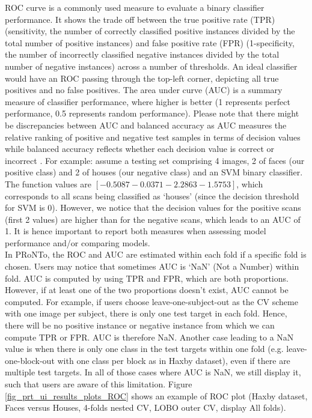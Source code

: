 ROC curve is a commonly used measure to evaluate a binary classifier performance. It shows the trade off between the true positive rate (TPR) (sensitivity, the number of correctly classified positive instances divided by the total number of positive instances) and false positive rate (FPR) (1-specificity, the number of incorrectly classified negative instances divided by the total number of negative instances) across a number of thresholds. An ideal classifier would have an ROC passing through the top-left corner, depicting all true positives and no false positives. The area under curve (AUC) is a summary measure of classifier performance, where higher is better (1 represents perfect performance, 0.5 represents random performance). Please note that there might be discrepancies between AUC and balanced accuracy as AUC measures the relative ranking of positive and negative test samples in terms of decision values while balanced accuracy reflects whether each decision value is correct or incorrect \cite{Fawcett2006}. For example: assume a testing set comprising 4 images, 2 of faces (our positive class) and 2 of houses (our negative class) and an SVM binary classifier. The function values are $[-0.5087 -0.0371  -2.2863 -1.5753]$, which corresponds to all scans being classified as `houses' (since the decision threshold for SVM is 0). However, we notice that the decision values for the positive scans (first 2 values) are higher than for the negative scans, which leads to an AUC of 1. It is hence important to report both measures when assessing model performance and/or comparing models.
\\

In PRoNTo, the ROC and AUC are estimated within each fold if a specific fold is chosen. %
Users may notice that sometimes AUC is `NaN' (Not a Number) within fold. AUC is computed by using TPR and FPR, which are both proportions. However, if at least one of the two proportions doesn't exist, AUC cannot be computed. For example, if users choose leave-one-subject-out as the CV scheme with one image per subject, there is only one test target in each fold. Hence, there will be no positive instance or negative instance from which we can compute TPR or FPR. AUC is therefore NaN. Another case leading to a NaN value is when there is only one class in the test targets within one fold (e.g. leave-one-block-out with one class per block as in Haxby dataset), even if there are multiple test targets. In all of those cases where AUC is NaN, we still display it, such that users are aware of this limitation.  Figure \ref{fig_prt_ui_results_plots_ROC} shows an example of ROC plot (Haxby dataset, Faces versus Houses, 4-folds nested CV, LOBO outer CV, display All folds).

